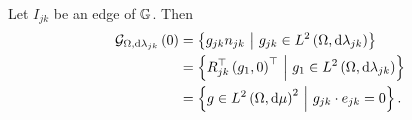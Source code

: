 \begin{prop}\label{prop:RotationOfEdgeGradients}
	Let $I_{jk}$ be an edge of $\mathbb{G}$.
	Then
	\begin{align*}
		\mathcal{G}_{ \Omega, \mathrm{d}\lambda_{jk}}\left( 0 \right) 
		&= \left\{  g_{jk}n_{jk} \ \middle\vert \  g_{jk}\in L^{2}\left( \Omega,\mathrm{d}\lambda_{jk} \right)  \right\} \\
		&= \left\{  R_{jk}^{\top} \left( g_1,0 \right)^\top \ \middle\vert \  g_1\in L^{2}\left( \Omega,\mathrm{d}\lambda_{jk} \right)  \right\} \\
		&= \left\{  g\in L^{2}\left( \Omega,\mathrm{d}\mu \right)^2 \ \middle\vert \  g_{jk}\cdot e_{jk} =0  \right\}.
	\end{align*}
\end{prop}
%
%
